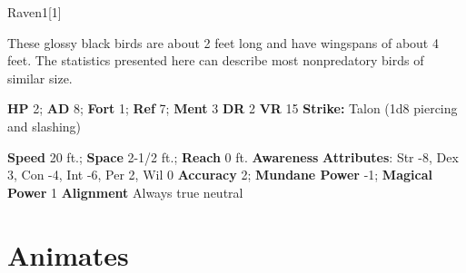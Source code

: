   
  \begin{monsection}{Raven}{1}[1]
    \vspace{-1em}\vspace{-1em}
    \vspace{0em}

    
      These glossy black birds are about 2 feet long and have wingspans of about 4 feet.
      The statistics presented here can describe most nonpredatory birds of similar size.
    
    

    \begin{spellcontent}
      \begin{spelltargetinginfo}
        \pari \textbf{HP} 2;
          \textbf{AD} 8;
          \textbf{Fort} 1;
          \textbf{Ref} 7;
          \textbf{Ment} 3
        \pari \textbf{DR} 2
        \pari \textbf{VR} 15
        \pari \textbf{Strike:}
            Talon  (1d8 piercing and slashing)
      \end{spelltargetinginfo}
    \end{spellcontent}
    \begin{monsterfooter}
      \pari \textbf{Speed} 20 ft.;
        \textbf{Space} 2-1/2 ft.;
        \textbf{Reach} 0 ft.
      \pari \textbf{Awareness} 
      \pari \textbf{Attributes}:
        Str -8, Dex 3,
        Con -4, Int -6,
        Per 2, Wil 0
      \pari \textbf{Accuracy} 2;
        \textbf{Mundane Power} -1;
      \textbf{Magical Power} 1
      \pari \textbf{Alignment} Always true neutral
    \end{monsterfooter}
  \end{monsection}
  
  
        \section{Animates}
      
